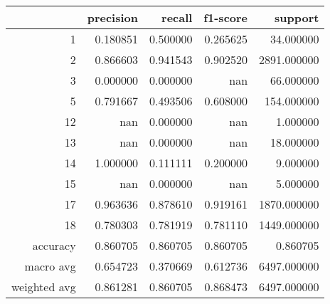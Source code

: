\begin{tabular}{rrrrr}
\toprule
 & precision & recall & f1-score & support \\
\midrule
1 & 0.180851 & 0.500000 & 0.265625 & 34.000000 \\
2 & 0.866603 & 0.941543 & 0.902520 & 2891.000000 \\
3 & 0.000000 & 0.000000 & nan & 66.000000 \\
5 & 0.791667 & 0.493506 & 0.608000 & 154.000000 \\
12 & nan & 0.000000 & nan & 1.000000 \\
13 & nan & 0.000000 & nan & 18.000000 \\
14 & 1.000000 & 0.111111 & 0.200000 & 9.000000 \\
15 & nan & 0.000000 & nan & 5.000000 \\
17 & 0.963636 & 0.878610 & 0.919161 & 1870.000000 \\
18 & 0.780303 & 0.781919 & 0.781110 & 1449.000000 \\
accuracy & 0.860705 & 0.860705 & 0.860705 & 0.860705 \\
macro avg & 0.654723 & 0.370669 & 0.612736 & 6497.000000 \\
weighted avg & 0.861281 & 0.860705 & 0.868473 & 6497.000000 \\
\bottomrule
\end{tabular}
